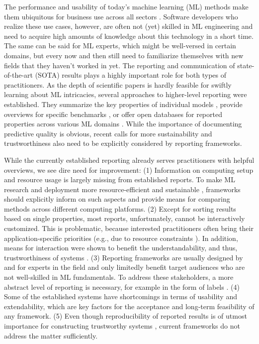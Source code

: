 \documentclass[sn-mathphys,Numbered]{sn-jnl}%
\theoremstyle{thmstylethree}%
\begin{document}
The performance and usability of today's machine learning (ML) methods make them ubiquitous for business use across all sectors \cite{fischer_prioritization_2023}.
Software developers who realize these use cases, however, are often not (yet) skilled in ML engineering and need to acquire high amounts of knowledge about this technology in a short time.
The same can be said for ML experts, which might be well-versed in certain domains, but every now and then still need to familiarize themselves with new fields that they haven't worked in yet.
The reporting and communication of state-of-the-art (SOTA) results plays a highly important role for both types of practitioners.
As the depth of scientific papers is hardly feasible for swiftly learning about ML intricacies, several approaches to higher-level reporting were established.
They summarize the key properties of individual models \cite{arnold2019factsheets,Mitchell/etal/2019a,yeswecare}, provide overviews for specific benchmarks \cite{croce2020robustbench,godahewa2021monash}, or offer open databases for reported properties across various ML domains \cite{vanschoren2014openml,paperswithcode}.
While the importance of documenting predictive quality is obvious, recent calls for more sustainability \cite{van_wynsberghe_sustainable_2021} and trustworthiness \cite{chatila_trustworthy_2021} also need to be explicitly considered by reporting frameworks.

While the currently established reporting already serves practitioners with helpful overviews, we see dire need for improvement: 
(1) Information on computing setup and resource usage is largely missing from established reports.
To make ML research and deployment more resource-efficient \cite{Assessing_Energy_Efficiency_of_ML} and sustainable \cite{kar_how_2022}, frameworks should explicitly inform on such aspects and provide means for comparing methods across different computing platforms.
(2) Except for sorting results based on single properties, most reports, unfortunately, cannot be interactively customized.
This is problematic, because interested practitioners often bring their application-specific priorities (e.g., due to resource constraints \cite{morik2022machine}).
In addition, means for interaction were shown to benefit the understandability, and thus, trustworthiness of systems \cite{beckhsok}.
(3) Reporting frameworks are usually designed by and for experts in the field and only limitedly benefit target audiences who are not well-skilled in ML fundamentals.
To address these stakeholders, a more abstract level of reporting is necessary, for example in the form of labels \cite{yeswecare}.
(4) Some of the established systems have shortcomings in terms of usability and extendability, which are key factors for the acceptance and long-term feasibility of any framework.
(5) Even though reproducibility of reported results \cite{hutson_artificial_2018} is of utmost importance for constructing trustworthy systems \cite{avin_filling_2021}, current frameworks do not address the matter sufficiently.
\end{document}
